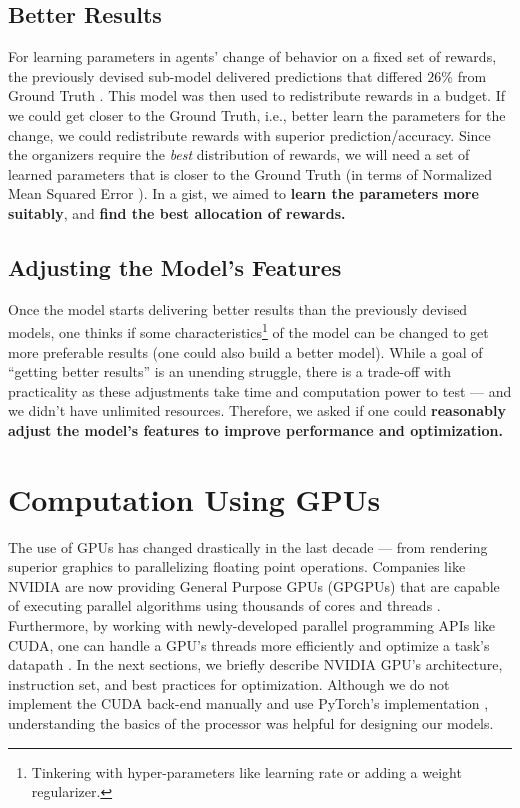 \subsection{Better Results} \label{sec:Important Questions - Better Results}
For learning parameters in agents' change of behavior on a fixed set of rewards, the previously devised sub-model delivered predictions that differed $26\%$ from Ground Truth \cite[Table~1]{Xue2016Avi2}. This model was then used to redistribute rewards in a budget. If we could get closer to the Ground Truth, i.e., better learn the parameters for the change, we could redistribute rewards with superior prediction/accuracy. Since the organizers require the \textit{best} distribution of rewards, we will need a set of learned parameters that is closer to the Ground Truth (in terms of Normalized Mean Squared Error \cite[Section~4.2]{Xue2016Avi2}). In a gist, we aimed to \textbf{learn the parameters more suitably}, and \textbf{find the  best allocation of rewards.}

\subsection{Adjusting the Model's Features} \label{sec:Important Questions - Adjusting the Model's Features}
Once the model starts delivering better results than the previously devised models, one thinks if some characteristics\footnote{Tinkering with hyper-parameters like learning rate or adding a weight regularizer.} of the model can be changed to get more preferable results (one could also build a better model). While a goal of ``getting better results'' is an unending struggle, there is a trade-off with practicality as these adjustments take time and computation power to test --- and we didn't have unlimited resources. Therefore, we asked if one could \textbf{reasonably adjust the model's features to improve performance and optimization.}

\section{Computation Using GPUs} \label{sec:Computation Using GPUs}
The use of GPUs has changed drastically in the last decade --- from rendering superior graphics to parallelizing floating point operations. Companies like NVIDIA are now providing General Purpose GPUs (GPGPUs) that are capable of executing parallel algorithms using thousands of cores and threads \cite{NVIDIA}. Furthermore, by working with newly-developed parallel programming APIs like CUDA, one can handle a GPU's threads more efficiently and optimize a task's datapath \cite{CUDADocs}. In the next sections, we briefly describe NVIDIA GPU's architecture, instruction set, and best practices for optimization. Although we do not implement the CUDA back-end manually and use PyTorch's implementation \cite{PTDocs}, understanding the basics of the processor was helpful for designing our models.


